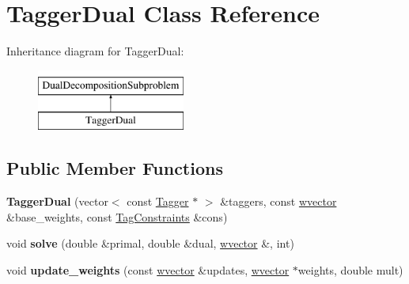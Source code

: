 \hypertarget{classTaggerDual}{
\section{TaggerDual Class Reference}
\label{classTaggerDual}
}
Inheritance diagram for TaggerDual:\begin{figure}[H]
\begin{center}
\leavevmode
\includegraphics[height=2cm]{classTaggerDual}
\end{center}
\end{figure}
\subsection*{Public Member Functions}
\begin{DoxyCompactItemize}
\item 
\hypertarget{classTaggerDual_a2b16f45c3550e4f4871841c9ee02de4f}{
{\bfseries TaggerDual} (vector$<$ const \hyperlink{classTagger}{Tagger} $\ast$ $>$ \&taggers, const \hyperlink{classsvector}{wvector} \&base\_\-weights, const \hyperlink{classTagConstraints}{TagConstraints} \&cons)}
\label{classTaggerDual_a2b16f45c3550e4f4871841c9ee02de4f}

\item 
\hypertarget{classTaggerDual_a047785058d058492172280e50a8f4c1a}{
void {\bfseries solve} (double \&primal, double \&dual, \hyperlink{classsvector}{wvector} \&, int)}
\label{classTaggerDual_a047785058d058492172280e50a8f4c1a}

\item 
\hypertarget{classTaggerDual_a01f7705a69c7cc993268c6e66df57ae0}{
void {\bfseries update\_\-weights} (const \hyperlink{classsvector}{wvector} \&updates, \hyperlink{classsvector}{wvector} $\ast$weights, double mult)}
\label{classTaggerDual_a01f7705a69c7cc993268c6e66df57ae0}

\end{DoxyCompactItemize}
